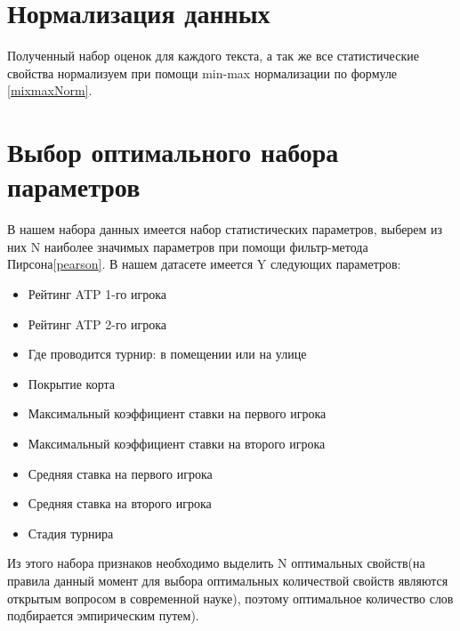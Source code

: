\section{Нормализация данных}
Полученный набор оценок для каждого текста, а так же все статистические свойства нормализуем при помощи min-max нормализации по формуле \ref{mixmaxNorm}.
\section{Выбор оптимального набора параметров}
В нашем набора данных имеется набор статистических параметров, выберем из них N наиболее значимых параметров при помощи фильтр-метода Пирсона\ref{pearson}.
В нашем датасете имеется Y следующих параметров:
\begin{itemize}
	\item Рейтинг ATP 1-го игрока
	\item Рейтинг ATP 2-го игрока
	\item Где проводится турнир: в помещении или на улице
	\item Покрытие корта
	\item Максимальный коэффициент ставки на первого игрока
	\item Максимальный коэффициент ставки на второго игрока
	\item Средняя ставка на первого игрока
	\item Средняя ставка на второго игрока
	\item Стадия турнира
\end{itemize}

Из этого набора признаков необходимо выделить N оптимальных свойств(на правила данный момент для выбора оптимальных количествой свойств являются открытым вопросом в современной науке\cite{Book32}), поэтому оптимальное количество слов подбирается эмпирическим путем).
